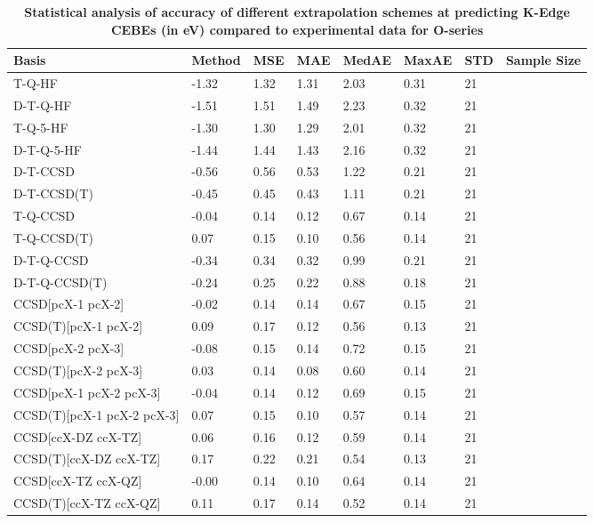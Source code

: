\begin{table}
  \caption{\textbf{Statistical analysis of accuracy of different extrapolation schemes at predicting K-Edge CEBEs (in eV) compared to experimental data for O-series}}
  \label{tbl:extrap-scheme-summary-o}
  \begin{tabular}{l l l l l l l l }
    \toprule
    \textbf{Basis} & \textbf{Method} & \textbf{MSE} & \textbf{MAE} & \textbf{MedAE} & \textbf{MaxAE} & \textbf{STD} & \textbf{Sample Size} \\ 
    \midrule
    T-Q-HF & -1.32 & 1.32 & 1.31 & 2.03 & 0.31 & 21 \\ 
    D-T-Q-HF & -1.51 & 1.51 & 1.49 & 2.23 & 0.32 & 21 \\ 
    T-Q-5-HF & -1.30 & 1.30 & 1.29 & 2.01 & 0.32 & 21 \\ 
    D-T-Q-5-HF & -1.44 & 1.44 & 1.43 & 2.16 & 0.32 & 21 \\ 
    D-T-CCSD & -0.56 & 0.56 & 0.53 & 1.22 & 0.21 & 21 \\ 
    D-T-CCSD(T) & -0.45 & 0.45 & 0.43 & 1.11 & 0.21 & 21 \\ 
    T-Q-CCSD & -0.04 & 0.14 & 0.12 & 0.67 & 0.14 & 21 \\ 
    T-Q-CCSD(T) & 0.07 & 0.15 & 0.10 & 0.56 & 0.14 & 21 \\ 
    D-T-Q-CCSD & -0.34 & 0.34 & 0.32 & 0.99 & 0.21 & 21 \\ 
    D-T-Q-CCSD(T) & -0.24 & 0.25 & 0.22 & 0.88 & 0.18 & 21 \\ 
    CCSD[pcX-1 pcX-2] & -0.02 & 0.14 & 0.14 & 0.67 & 0.15 & 21 \\ 
    CCSD(T)[pcX-1 pcX-2] & 0.09 & 0.17 & 0.12 & 0.56 & 0.13 & 21 \\ 
    CCSD[pcX-2 pcX-3] & -0.08 & 0.15 & 0.14 & 0.72 & 0.15 & 21 \\ 
    CCSD(T)[pcX-2 pcX-3] & 0.03 & 0.14 & 0.08 & 0.60 & 0.14 & 21 \\ 
    CCSD[pcX-1 pcX-2 pcX-3] & -0.04 & 0.14 & 0.12 & 0.69 & 0.15 & 21 \\ 
    CCSD(T)[pcX-1 pcX-2 pcX-3] & 0.07 & 0.15 & 0.10 & 0.57 & 0.14 & 21 \\ 
    CCSD[ccX-DZ ccX-TZ] & 0.06 & 0.16 & 0.12 & 0.59 & 0.14 & 21 \\ 
    CCSD(T)[ccX-DZ ccX-TZ] & 0.17 & 0.22 & 0.21 & 0.54 & 0.13 & 21 \\ 
    CCSD[ccX-TZ ccX-QZ] & -0.00 & 0.14 & 0.10 & 0.64 & 0.14 & 21 \\ 
    CCSD(T)[ccX-TZ ccX-QZ] & 0.11 & 0.17 & 0.14 & 0.52 & 0.14 & 21 \\ 

\end{tabular}
\end{table}
